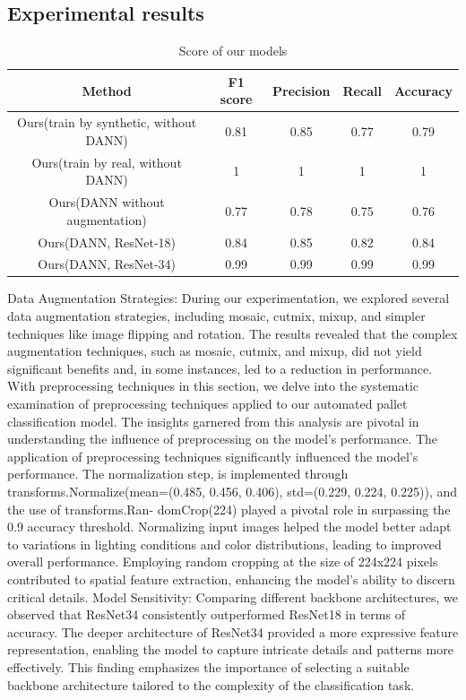 \documentclass[nonacm, sigconf]{acmart}
\begin{document}
\subsection{Experimental results}
\noindent
\begin{table}
  \caption{Score of our models}
  \label{table Score of our models}
  \begin{tabular}{c|cccc}
    \toprule
    Method&F1 score&Precision&Recall&Accuracy\\
    \midrule
     Ours(train by synthetic, without DANN)&0.81&0.85&0.77&0.79\\
     Ours(train by real, without DANN)&1&1&1&1\\
     Ours(DANN without augmentation)&0.77&0.78&0.75&0.76\\ 
     Ours(DANN, ResNet-18)&0.84&0.85&0.82&0.84\\
     Ours(DANN, ResNet-34)&0.99&0.99&0.99&0.99\\
  \bottomrule
\end{tabular}
\end{table}
Data Augmentation Strategies:
During our experimentation, we explored several data augmentation strategies, including mosaic, cutmix, mixup, and simpler techniques like image flipping and rotation. The results revealed that the complex augmentation techniques, such as mosaic, cutmix, and mixup, did not yield significant benefits and, in some instances, led to a reduction in performance. With preprocessing techniques in this section, we delve into the systematic examination of preprocessing techniques applied to our automated pallet classification model. The insights garnered from this analysis are pivotal in understanding the influence of preprocessing on the model's performance. The application of preprocessing techniques significantly influenced the model's performance. The normalization step, is implemented through transforms.Normalize(mean=(0.485, 0.456, 0.406), std=(0.229, 0.224, 0.225)), and the use of transforms.Ran- domCrop(224) played a pivotal role in surpassing the 0.9 accuracy threshold. Normalizing input images helped the model better adapt to variations in lighting conditions and color distributions, leading to improved overall performance. Employing random cropping at the size of 224x224 pixels contributed to spatial feature extraction, enhancing the model's ability to discern critical details.
Model Sensitivity: Comparing different backbone architectures, we observed that ResNet34 consistently outperformed ResNet18 in terms of accuracy. The deeper architecture of ResNet34 provided a more expressive feature representation, enabling the model to capture intricate details and patterns more effectively. This finding emphasizes the importance of selecting a suitable backbone architecture tailored to the complexity of the classification task.
\end{document}
